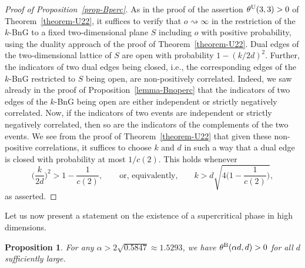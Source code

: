\documentclass[oneside]{amsart}
\newtheorem{prop}[theorem]{Proposition}
\theoremstyle{definition}
\renewcommand{\P}{\mathbb{P}}
\newcommand{\1}{\mathbbm{1}}
\newcommand{\0}{\mathbf{o}}
\newcommand*{\be}{\begin{equation}}
\newcommand*{\ee}{\end{equation}}
\newcommand{\basc}[1]{{\color{blue}{ \bf [~Bas:\ }\emph{#1}\textbf{~]}}}
\numberwithin{equation}{section}
\begin{document}
\begin{proof}[Proof of Proposition~\ref{prop-Bperc}]
As in the proof of the assertion $\theta^{\rm U}(3,3)>0$ of Theorem~\ref{theorem-U22}, it suffices to verify that $o \rightsquigarrow \infty$ in the restriction of the $k$-BnG to a fixed two-dimensional plane $S$ including $o$ with positive probability, using the duality approach of the proof of Theorem~\ref{theorem-U22}. Dual edges of the two-dimensional lattice of $S$ are open with probability  $1-(k/2d)^2$. %
Further, the indicators of two dual edges being closed, i.e., the corresponding edges of the $k$-BnG restricted to $S$ being open, are non-positively correlated. Indeed, we saw already in the proof of Proposition~\ref{lemma-Bnoperc} that the indicators of two edges of the $k$-BnG being open are either independent or strictly negatively correlated. Now, if the indicators of two events are independent or strictly negatively correlated, then so are the indicators of the complements of the two events. We see from the proof of Theorem~\ref{theorem-U22} that given these non-positive correlations, it suffices to choose $k$ and $d$ in such a way that a dual edge is closed with probability at most $1/c(2)$. This holds whenever 
\be  
\Big(\frac{k}{2d}\Big)^2 > 1-\frac{1}{c(2)},\qquad \text{or, equivalently,}\qquad k>d\sqrt{4\Big(1-\frac{1}{c(2)}\Big)}, 
\ee
as asserted. 
\end{proof}

Let us now present a statement on the existence of a supercritical phase in high dimensions.

\begin{prop}\label{prop-1indep}
For any $\alpha > 2 \sqrt{0.5847} \approx 1.5293$, we have $\theta^{\rm B}(\alpha d, d)>0$ for all $d$ sufficiently large.
\end{prop}
\end{document}
